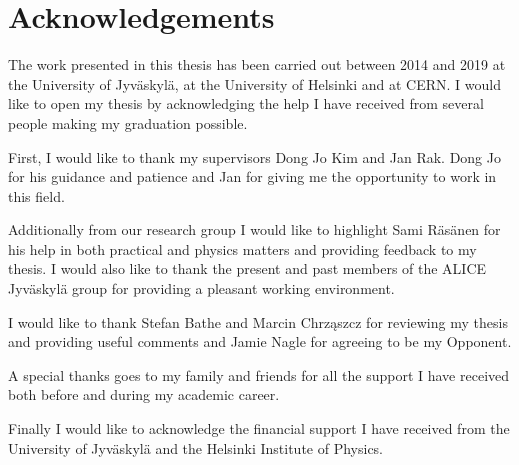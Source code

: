 \section*{Acknowledgements} 

The work presented in this thesis has been carried out between 2014 and 2019 at the University of Jyväskylä, at the University of Helsinki and at CERN. I would like to open my thesis by acknowledging the help I have received from several people making my graduation possible.

First, I would like to thank my supervisors Dong Jo Kim and Jan Rak. Dong Jo for his guidance and patience and Jan for giving me the opportunity to work in this field.

Additionally from our research group I would like to highlight Sami Räsänen for his help in both practical and physics matters and providing feedback to my thesis. I would also like to thank the present and past members of the ALICE Jyväskylä group for providing a pleasant working environment.


I would like to thank Stefan Bathe and Marcin Chrząszcz for reviewing my thesis and providing useful comments and Jamie Nagle for agreeing to be my Opponent.

A special thanks goes to my family and friends for all the support I have received both before and during my academic career.

Finally I would like to acknowledge the financial support I have received from the University of Jyväskylä and the Helsinki Institute of Physics.


